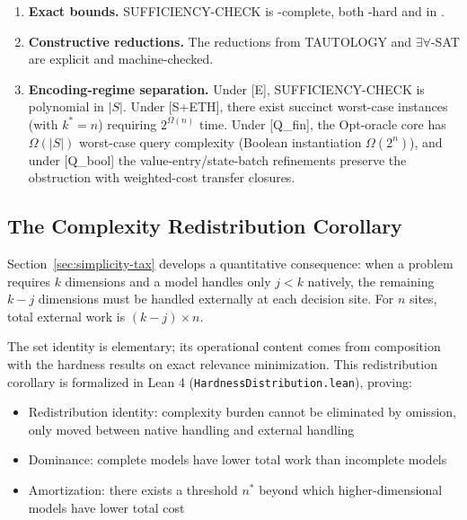 \begin{enumerate}
\item \textbf{Exact bounds.} SUFFICIENCY-CHECK is \coNP-complete, both \coNP-hard and in \coNP.

\item \textbf{Constructive reductions.} The reductions from TAUTOLOGY and $\exists\forall$-SAT are explicit and machine-checked.

\item \textbf{Encoding-regime separation.} Under [E], SUFFICIENCY-CHECK is polynomial in $|S|$. Under [S+ETH], there exist succinct worst-case instances (with $k^*=n$) requiring $2^{\Omega(n)}$ time. Under [Q\_fin], the Opt-oracle core has $\Omega(|S|)$ worst-case query complexity (Boolean instantiation $\Omega(2^n)$), and under [Q\_bool] the value-entry/state-batch refinements preserve the obstruction with weighted-cost transfer closures.
\end{enumerate}

\subsection*{The Complexity Redistribution Corollary}

Section~\ref{sec:simplicity-tax} develops a quantitative consequence: when a problem requires $k$ dimensions and a model handles only $j < k$ natively, the remaining $k - j$ dimensions must be handled externally at each decision site. For $n$ sites, total external work is $(k-j) \times n$.

The set identity is elementary; its operational content comes from composition with the hardness results on exact relevance minimization. This redistribution corollary is formalized in Lean 4 (\texttt{HardnessDistribution.lean}), proving:
\begin{itemize}
\item Redistribution identity: complexity burden cannot be eliminated by omission, only moved between native handling and external handling
\item Dominance: complete models have lower total work than incomplete models
\item Amortization: there exists a threshold $n^*$ beyond which higher-dimensional models have lower total cost
\end{itemize}

